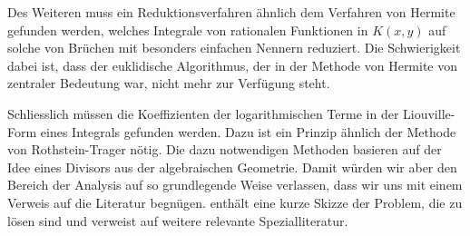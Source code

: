 Des Weiteren muss ein Reduktionsverfahren ähnlich dem Verfahren von
Hermite gefunden werden, welches Integrale von rationalen Funktionen
in $K(x,y)$ auf solche von Brüchen mit besonders einfachen Nennern
reduziert.
Die Schwierigkeit dabei ist, dass der euklidische Algorithmus, der
in der Methode von Hermite von zentraler Bedeutung war, nicht mehr
zur Verfügung steht.

Schliesslich müssen die Koeffizienten der logarithmischen Terme
in der Liouville-Form eines Integrals gefunden werden.
Dazu ist ein Prinzip ähnlich der Methode von Rothstein-Trager
nötig.
Die dazu notwendigen Methoden basieren auf der Idee eines Divisors
aus der algebraischen Geometrie.
Damit würden wir aber den Bereich der Analysis auf so grundlegende
Weise verlassen, dass wir uns mit einem Verweis auf die Literatur
begnügen.
\cite{buch:algorithms} enthält eine kurze Skizze der Problem, die 
zu lösen sind und verweist auf weitere relevante Spezialliteratur.








